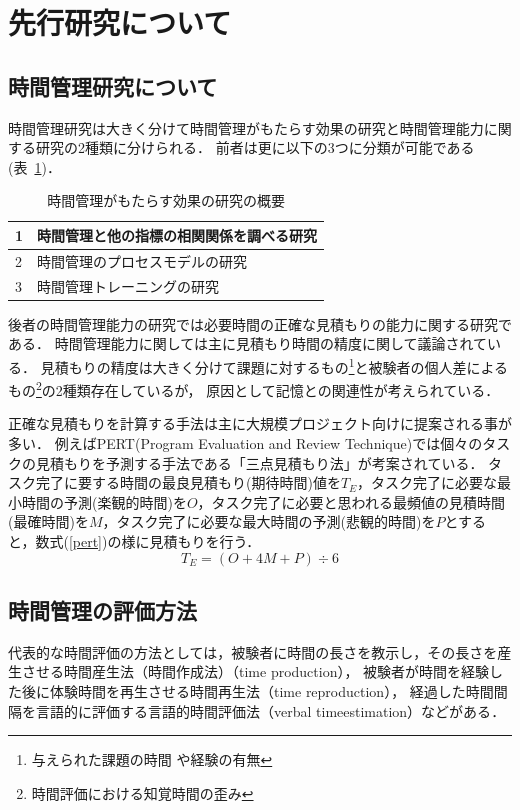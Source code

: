 \section{先行研究について}
\subsection{時間管理研究について}
時間管理研究は大きく分けて時間管理がもたらす効果の研究と時間管理能力に関する研究の2種類に分けられる．
前者は更に以下の3つに分類が可能である(表~\ref{tb:senko})．
\begin{table}[htb]
\begin{center}
  \begin{tabular}{|l|l|} \hline
   1 & 時間管理と他の指標の相関関係を調べる研究 \\ \hline
   2 & 時間管理のプロセスモデルの研究 \\ \hline
   3 & 時間管理トレーニングの研究 \\ \hline
  \end{tabular}
  \caption{時間管理がもたらす効果の研究の概要}
  \label{tb:senko}
\end{center}
\end{table}

後者の時間管理能力の研究では必要時間の正確な見積もりの能力に関する研究である．
時間管理能力に関しては主に見積もり時間の精度に関して議論されている．
見積もりの精度は大きく分けて課題に対するもの\footnote{与えられた課題の時間 \cite{Roy2008}や経験の有無\cite{Roy2007}}と被験者の個人差によるもの\footnote{時間評価における知覚時間の歪み\cite{Oguro1961}\cite{Murakami2016}}の2種類存在しているが，
原因として記憶との関連性が考えられている\cite{Roy2005}．

正確な見積もりを計算する手法は主に大規模プロジェクト向けに提案される事が多い．
例えばPERT(Program Evaluation and Review Technique)では個々のタスクの見積もりを予測する手法である「三点見積もり法」が考案されている．
タスク完了に要する時間の最良見積もり(期待時間)値を$T_{E}$，タスク完了に必要な最小時間の予測(楽観的時間)を$O$，タスク完了に必要と思われる最頻値の見積時間(最確時間)を$M$，タスク完了に必要な最大時間の予測(悲観的時間)を$P$とすると，数式(\ref{pert})の様に見積もりを行う．
\begin{equation}
\label{pert}
T_{E} = (O + 4M + P) ÷ 6
\end{equation}

\subsection{時間管理の評価方法}
代表的な時間評価の方法としては，被験者に時間の長さを教示し，その長さを産生させる時間産生法（時間作成法）（time production），
被験者が時間を経験した後に体験時間を再生させる時間再生法（time reproduction），
経過した時間間隔を言語的に評価する言語的時間評価法（verbal timeestimation）などがある\cite{Oguro1961}\cite{Tayama2018}．


